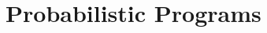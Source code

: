 \documentclass[subfiles]{the-pdg-manual.tex}
\begin{document}
\section{Probabilistic Programs}
\end{document}
